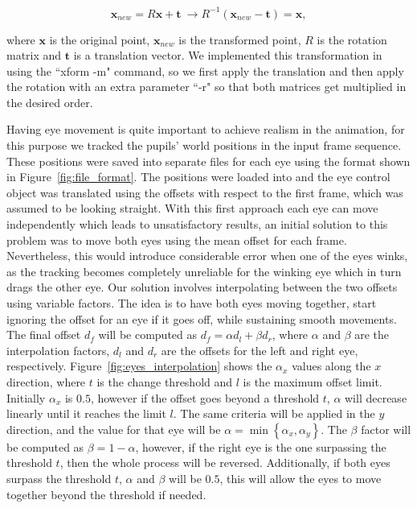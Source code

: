 \begin{equation}
\mathbf{x}_{new} = R\mathbf{x} + \mathbf{t} ~ \rightarrow  R^{-1}(\mathbf{x}_{new} - \mathbf{t}) = \mathbf{x},
\label{eq:rotation_translation_inv}
\end{equation}

where $\mathbf{x}$ is the original point, $\mathbf{x}_{new}$ is the transformed point, $R$ is the rotation matrix and $\mathbf{t}$ is a translation vector.
We implemented this transformation in \Maya using the ``xform -m" command, so we first apply the translation and then apply the rotation with an extra parameter ``-r" so that both matrices get multiplied in the desired order.

Having eye movement is quite important to achieve realism in the animation, for this purpose we tracked the pupils' world positions in the input frame sequence.
These positions were saved into separate files for each eye using the format shown in Figure~\ref{fig:file_format}.
The positions were loaded into \Maya and the eye control object was translated using the offsets with respect to the first frame, which was assumed to be looking straight.
With this first approach each eye can move independently which leads to unsatisfactory results, an initial solution to this problem was to move both eyes using the mean offset for each frame.
Nevertheless, this would introduce considerable error when one of the eyes winks, as the tracking becomes completely unreliable for the winking eye which in turn drags the other eye.
Our solution involves interpolating between the two offsets using variable factors.
The idea is to have both eyes moving together, start ignoring the offset for an eye if it goes off, while sustaining smooth movements.
The final offset $d_f$ will be computed as $d_f = \alpha d_l + \beta d_r$, where $\alpha$ and $\beta$ are the interpolation factors, $d_l$ and $d_r$ are the offsets for the left and right eye, respectively.
Figure~\ref{fig:eyes_interpolation} shows the $\alpha_x$ values along the $x$ direction, where $t$ is the change threshold and $l$ is the maximum offset limit.
Initially $\alpha_x$ is $0.5$, however if the offset goes beyond a threshold $t$, $\alpha$ will decrease linearly until it reaches the limit $l$.
The same criteria will be applied in the $y$ direction, and the value for that eye will be $\alpha = \min \left\lbrace \alpha_x, \alpha_y \right\rbrace$.
The $\beta$ factor will be computed as $\beta = 1 - \alpha$, however, if the right eye is the one surpassing the threshold $t$, then the whole process will be reversed. 
Additionally, if both eyes surpass the threshold $t$, $\alpha$ and $\beta$ will be $0.5$, this will allow the eyes to move together beyond the threshold if needed.

